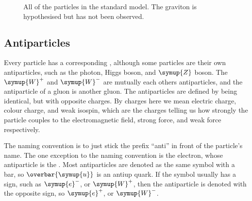\documentclass[fleqn]{NotesClass}
\newcommand{\Pparticle}[1]{\symup{#1}}
\newcommand{\Pu}{\ensuremath{\Pparticle{u}}}
\newcommand{\Pd}{\ensuremath{\Pparticle{d}}}
\newcommand{\Ps}{\ensuremath{\Pparticle{s}}}
\newcommand{\Pc}{\ensuremath{\Pparticle{c}}}
\newcommand{\Pt}{\ensuremath{\Pparticle{t}}}
\newcommand{\Pb}{\ensuremath{\Pparticle{b}}}
\newcommand{\Pe}{\ensuremath{\Pparticle{e}^{-}}}
\newcommand{\Pmu}{\ensuremath{\text{\normalfont μ}^{-}}}
\newcommand{\Ptau}{\ensuremath{\text{\normalfont τ}^{-}}}
\newcommand{\Pnue}{\ensuremath{\text{\normalfont ν}_{\symup{e}}}}
\newcommand{\Pnumu}{\ensuremath{\text{\normalfont ν}_{\text{μ}}}}
\newcommand{\Pnutau}{\ensuremath{\text{\normalfont ν}_{\text{τ}}}}
\newcommand{\PH}{\ensuremath{\Pparticle{H}}}
\newcommand{\PZ}{\ensuremath{\Pparticle{Z}}}
\newcommand{\PWpm}{\ensuremath{\Pparticle{W}^{\pm}}}
\newcommand{\PWp}{\ensuremath{\Pparticle{W}^{+}}}
\newcommand{\PWm}{\ensuremath{\Pparticle{W}^{-}}}
\newcommand{\Pphoton}{\ensuremath{\text{\normalfont γ}}}
\newcommand{\Pg}{\ensuremath{\Pparticle{g}}}
\newcommand{\APantiparticle}[1]{\overbar{#1}}
\newcommand{\APu}{\ensuremath{\APantiparticle{\Pparticle{u}}}}
\newcommand{\APe}{\ensuremath{\Pparticle{e}^{+}}}
\begin{document}
    \begin{figure}
        \caption{All of the particles in the standard model. The graviton is hypothesised but has not been observed.}
    \end{figure}
    
    \subsection{Antiparticles}
    Every particle has a corresponding , although some particles are their own antiparticles, such as the photon, Higgs boson, and \PZ{} boson.
    The \PWp{} and \PWm{} are mutually each others antiparticles, and the antiparticle of a gluon is another gluon.
    The antiparticles are defined by being identical, but with opposite charges.
    By charges here we mean electric charge, colour charge, and weak isospin, which are the charges telling us how strongly the particle couples to the electromagnetic field, strong force, and weak force respectively.
    
    The naming convention is to just stick the prefix \enquote{anti} in front of the particle's name.
    The one exception to the naming convention is the electron, whose antiparticle is the .
    Most antiparticles are denoted as the same symbol with a bar, so \APu{} is an antiup quark.
    If the symbol usually has a sign, such as \Pe, or \PWp, then the antiparticle is denoted with the opposite sign, so \APe\index{e+@\APe|see{positron}}, or \PWm.
    
\end{document}
